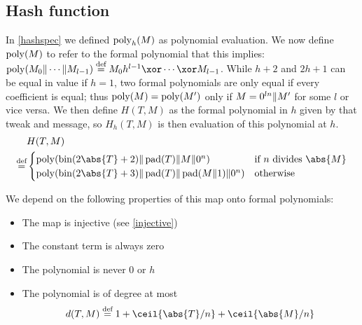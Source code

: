 \documentclass[hctr.tex]{subfiles}
\begin{document}
\subsection{Hash function}\label{hproperties}
In \autoref{hashspec} we defined \(\operatorname{poly}_h(M)\) as polynomial evaluation.
We now define \(\operatorname{poly}(M)\) to refer to the formal polynomial
that this implies: \(\poly(M_0 \Concat \cdots \Concat M_{l-1})
\defeq  M_0h^{l-1} \xor \cdots \xor M_{l-1}\).
While \(h + 2\) and \(2h + 1\) can be equal
in value if \(h = 1\), two formal polynomials are only equal
if every coefficient is equal; thus \(\operatorname{poly}(M) = \operatorname{poly}(M')\)
only if \(M = 0^{ln} \Vert M'\) for some \(l\) or vice versa.
We then define \(H(T, M)\) as the formal polynomial in \(h\) given
by that tweak and message,
so \(H_h(T, M)\) is then evaluation of this polynomial at \(h\).
\begin{align*}
    & H(T, M) \\
    \defeq &
    \begin{cases}
        \poly(\fromint(2\abs{T} + 2) \Concat \pad(T) \Concat M \Concat 0^n) &
        \text{if } n \text{ divides } \abs{M} \\
        \poly(\fromint(2\abs{T} + 3) \Concat \pad(T) \Concat \pad(M \Concat 1) \Concat 0^n) &
        \text{otherwise}
    \end{cases}    \\
\end{align*}

We depend on the following properties of this map 
onto formal polynomials:
\begin{itemize}
    \item The map is injective (see \autoref{injective})
    \item The constant term is always zero
    \item The polynomial is never \(0\) or \(h\)
    \item The polynomial is of degree at most
    \begin{displaymath}
        d(T, M) \defeq 1 + \ceil{\abs{T}/n} + \ceil{\abs{M}/n}
    \end{displaymath}
\end{itemize}
\end{document}
